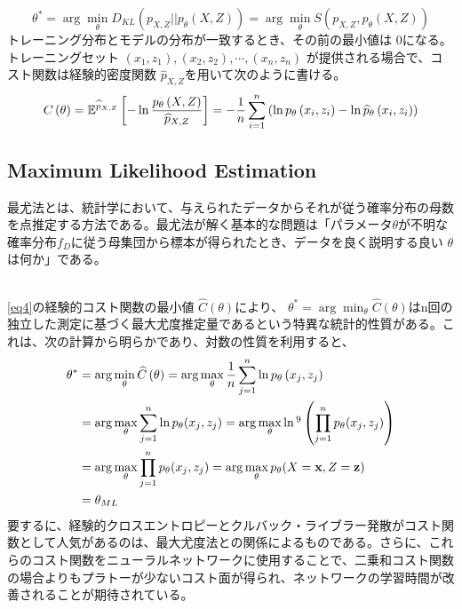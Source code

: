 \documentclass[a4paper]{jsarticle}%
\begin{document}
$$ \theta^* = \arg\min_{\theta} D_{KL} \left(p_{X,Z}||p_{\theta} \left(X,Z\right)\right) = \arg\min_\theta S \left(p_{X,Z},p_\theta \left(X,Z\right)\right) $$
トレーニング分布とモデルの分布が一致するとき、その前の最小値は $ 0 $になる。\\
トレーニングセット $\left(x_1,z_1\right), \left(x_2,z_2\right),\cdots , \left(x_n,z_n\right)$ が提供される場合で、コスト関数は経験的密度関数 $ \widehat{p}_{X,Z} $を用いて次のように書ける。
\begin{equation}
  C \left(\theta\right) = \mathbb{E}^{\widehat{p}_{X,Z}} \left[-\ln \dfrac{p_{\theta} \left(X,Z\right)}{\widehat{p}_{X,Z}}\right] = -\dfrac{1}{n}\sum_{i=1}^{n} \left(\ln p_{\theta} \left(x_i,z_i\right) -\ln \widehat{p}_\theta \left(x_i,z_i\right) \right)\notag
\end{equation}
\pagebreak
\subsection{\textbf{Maximum Likelihood Estimation}}

\begin{dfn}\label{def:MLE}
  最尤法とは、統計学において、与えられたデータからそれが従う確率分布の母数を点推定する方法である。最尤法が解く基本的な問題は「パラメータ$\displaystyle \theta$が不明な確率分布$\displaystyle f_{D}$に従う母集団から標本が得られたとき、データを良く説明する良い $\displaystyle \theta$は何か」である。
\end{dfn}
\, \\
\eqref{eq4}の経験的コスト関数の最小値 $ \widehat{C} \left(\theta\right) $により、 $ \theta^* = \arg\min_{\theta} \widehat{C} \left(\theta\right) $はn回の独立した測定に基づく最大尤度推定量であるという特異な統計的性質がある。これは、次の計算から明らかであり、対数の性質を利用すると、
\begin{align}
  \theta^* &= \arg\min_\theta \widehat{C} \left(\theta\right) = \arg\max_\theta \dfrac{1}{n}\sum_{j=1}^{n} \ln p_{\theta} \left(x_j,z_j\right) \notag\\
  &= \arg \max_{\theta} \sum_{j=1}^{n} \ln p_\theta(x_j, z_j) = \arg \max_{\theta} \ln \footnotemark[9]\left( \prod_{j=1}^{n} p_\theta(x_j,z_j) \right) \notag\\
  &= \arg \max_{\theta} \prod_{j=1}^{n} p_\theta(x_j, z_j) = \arg \max_{\theta} p_\theta(X = \mathbf{x}, Z = \mathbf{z})\notag\\
  &= \theta_{ML}\notag
\end{align}
要するに、経験的クロスエントロピーとクルバック・ライブラー発散がコスト関数として人気があるのは、最大尤度法との関係によるものである。さらに、これらのコスト関数をニューラルネットワークに使用することで、二乗和コスト関数の場合よりもプラトーが少ないコスト面が得られ、ネットワークの学習時間が改善されることが期待されている。
\end{document}
